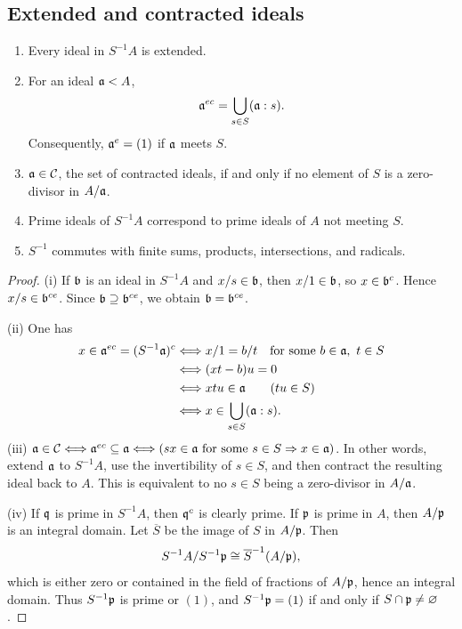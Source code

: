 \documentclass[11pt,a4paper]{article}
\begin{document}
\subsection{Extended and contracted ideals}
\setcounter{theorem}{6}\begin{proposition}
\begin{enumerate}[label=(\roman*)]
\setcounter{enumi}{0}\item Every ideal in $S^{-1}A$ is extended.
\setcounter{enumi}{1}\item For an ideal $\aa<A$,
\[\aa^{ec}=\bigcup_{s\in S}(\aa:s).\]
Consequently, $\aa^e=(1)$ if $\aa$ meets $S$.
\setcounter{enumi}{2}\item $\aa\in\mathcal C$, the set of contracted ideals, if and only if no element of $S$ is a zero-divisor in $A/\aa$.
\setcounter{enumi}{3}\item Prime ideals of $S^{-1}A$ correspond to prime ideals of $A$ not meeting $S$.
\setcounter{enumi}{4}\item $S^{-1}$ commutes with finite sums, products, intersections, and radicals.
\end{enumerate}
\end{proposition}
\begin{proof}
(i) If $\bb$ is an ideal in $S^{-1}A$ and $x/s\in\bb$, then $x/1\in\bb$, so $x\in\bb^c$. Hence $x/s\in\bb^{ce}$. Since $\bb\supseteq\bb^{ce}$, we obtain $\bb=\bb^{ce}$.

(ii) One has
\[
\begin{aligned}
x\in\aa^{ec}=(S^{-1}\aa)^c
&\Longleftrightarrow x/1=b/t\quad\text{for some }b\in\aa,\ t\in S\\
&\Longleftrightarrow(xt-b)u=0\\
&\Longleftrightarrow xtu\in\aa\qquad(tu\in S)\\
&\Longleftrightarrow x\in\bigcup_{s\in S}(\aa:s).
\end{aligned}
\]
(iii) $\aa\in\mathcal C\Longleftrightarrow\aa^{ec}\subseteq\aa\Longleftrightarrow(sx\in\aa\text{ for some }s\in S\Rightarrow x\in\aa)$. In other words, extend $\aa$ to $S^{-1}A$, use the invertibility of $s\in S$, and then contract the resulting ideal back to $A$. This is equivalent to no $s\in S$ being a zero-divisor in $A/\aa$.

(iv) If $\qq$ is prime in $S^{-1}A$, then $\qq^c$ is clearly prime. If $\pp$ is prime in $A$, then $A/\pp$ is an integral domain. Let $\overline S$ be the image of $S$ in $A/\pp$. Then
\[
S^{-1}A/S^{-1}\pp\cong\overline S^{-1}(A/\pp),
\]
which is either zero or contained in the field of fractions of $A/\pp$, hence an integral domain.
Thus $S^{-1}\pp$ is prime or $(1)$, and $S^{-1}\pp=(1)$ if and only if $S\cap\pp\ne\varnothing$.

\end{proof}
\end{document}
